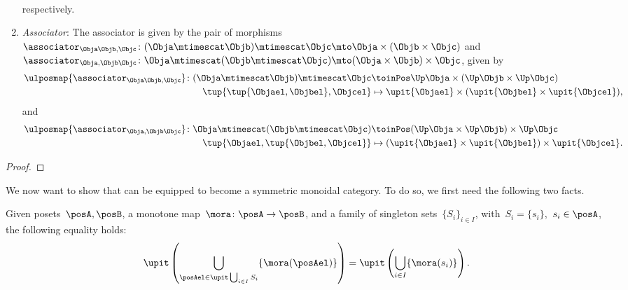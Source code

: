 \begin{lemma}
\begin{enumerate}
\begin{equation}
\begin{aligned}
            \end{aligned}
        \end{equation}
        respectively.
        \item \emph{Associator}: The associator is given by the pair of morphisms~$\associator_{\Obja\Objb,\Objc}\colon (\Obja\mtimescat \Objb)\mtimescat \Objc \mto \Obja\times ( \Objb \times \Objc)$ and~$\associator_{\Obja,\Objb\Objc}\colon \Obja\mtimescat (\Objb\mtimescat \Objc) \mto (\Obja\times \Objb) \times \Objc$, given by
        \begin{equation}
            \begin{aligned}
                \ulposmap{\associator_{\Obja\Objb,\Objc}}\colon (\Obja\mtimescat \Objb)\mtimescat \Objc &\toinPos \Up \Obja\times (\Up \Objb \times \Up \Objc)\\
                \tup{\tup{\Objael,\Objbel},\Objcel}&\mapsto \upit\{\Objael\}\times (\upit\{\Objbel\}\times \upit\{\Objcel\}),
            \end{aligned}
        \end{equation}
        and
        \begin{equation}
            \begin{aligned}
                \ulposmap{\associator_{\Obja,\Objb\Objc}}\colon \Obja\mtimescat (\Objb\mtimescat \Objc) &\toinPos (\Up \Obja\times \Up \Objb) \times \Up \Objc\\
                \tup{\Objael,\tup{\Objbel,\Objcel}}&\mapsto (\upit\{\Objael\}\times \upit\{\Objbel\})\times \upit\{\Objcel\}.
            \end{aligned}
        \end{equation}
    \end{enumerate}
\end{lemma}
\begin{proof}
\end{proof}


We now want to show that \UPos can be equipped to become a symmetric monoidal category.
To do so, we first need the following two facts.

\begin{lemma}
    \label{lem:unpack_u_functor}
    Given posets~$\posA,\posB$, a monotone map~$\mora \colon \posA \to \posB$, and a family of singleton sets~$\{S_i\}_{i\in I}$, with~$S_i=\{s_i\}$,~$s_i\in \posA$, the following equality holds:
    \begin{equation}
        \label{eq:lemma_unpack}
        \upit \left( \bigcup_{\posAel \in \upit \bigcup_{i\in I}S_i}\{\mora(\posAel)\}\right)= \upit \left( \bigcup_{i\in I} \{\mora(s_i)\}\right).
    \end{equation}
\end{lemma}

